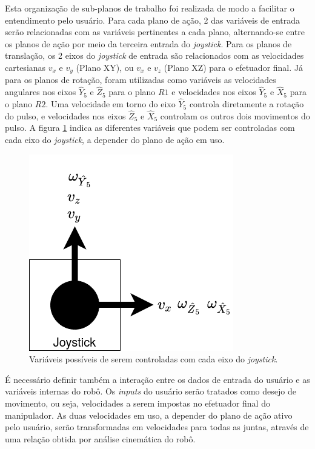 Esta organização de sub-planos de trabalho foi realizada de modo a facilitar 
o entendimento pelo usuário. Para cada plano de ação, 2 das variáveis de entrada 
serão relacionadas com as variáveis pertinentes a cada plano, alternando-se entre 
os planos de ação por meio da terceira entrada do \textit{joystick}. 
Para os planos de translação, os 2 eixos do \textit{joystick} de entrada 
são relacionados com as velocidades cartesianas $v_x$ e $v_y$ (Plano XY), ou 
$v_x$ e $v_z$ (Plano XZ) para o efetuador final. Já para os planos de rotação, foram utilizadas 
como variáveis as velocidades angulares nos eixos $\hat{Y}_5$ e $\hat{Z}_5$ para o plano
$R1$ e velocidades nos eixos $\hat{Y}_5$ e $\hat{X}_5$ para o plano $R2$. Uma velocidade em torno
do eixo $\hat{Y}_5$ controla diretamente a rotação do pulso, e velocidades nos eixos
$\hat{Z}_5$ e $\hat{X}_5$ controlam os outros dois movimentos do pulso.
A figura \ref{fig:joystick} indica as diferentes variáveis que podem ser controladas
com cada eixo do \textit{joystick}, a depender do plano de ação em uso.

\begin{figure}[h]
    \caption{Variáveis possíveis de serem controladas com cada eixo do \textit{joystick}.}

    \begin{centering}
        \includegraphics[width=0.4\columnwidth]{images/controle/joystick.png} 
    \par\end{centering}

    \label{fig:joystick}
\end{figure}

É necessário definir também a interação entre os dados de entrada do usuário e 
as variáveis internas do robô. 
Os \textit{inputs} do usuário serão tratados como desejo de movimento, ou seja, velocidades a 
serem impostas no efetuador final do manipulador. 
As duas velocidades em uso, a depender do plano de ação ativo pelo usuário, serão
transformadas em velocidades para todas as juntas, através de uma relação obtida por
análise cinemática do robô.

